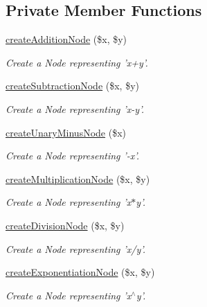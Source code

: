 \subsection*{Private Member Functions}
\begin{DoxyCompactItemize}
\item 
\hyperlink{classMathParser_1_1Interpreting_1_1Differentiator_a0ca77a885d67637f3858e524fe25f94f}{create\-Addition\-Node} (\$x, \$y)
\begin{DoxyCompactList}\small\item\em Create a Node representing 'x+y'. \end{DoxyCompactList}\item 
\hyperlink{classMathParser_1_1Interpreting_1_1Differentiator_aad54652f37938c29c9a426fd568746c8}{create\-Subtraction\-Node} (\$x, \$y)
\begin{DoxyCompactList}\small\item\em Create a Node representing 'x-\/y'. \end{DoxyCompactList}\item 
\hyperlink{classMathParser_1_1Interpreting_1_1Differentiator_a08a7721f2512b45848054ff53ff0a3a5}{create\-Unary\-Minus\-Node} (\$x)
\begin{DoxyCompactList}\small\item\em Create a Node representing '-\/x'. \end{DoxyCompactList}\item 
\hyperlink{classMathParser_1_1Interpreting_1_1Differentiator_a76e94a286700f2913e1f69b985ccd110}{create\-Multiplication\-Node} (\$x, \$y)
\begin{DoxyCompactList}\small\item\em Create a Node representing 'x$\ast$y'. \end{DoxyCompactList}\item 
\hyperlink{classMathParser_1_1Interpreting_1_1Differentiator_a5ba6c413896c0e4d05f579898df23204}{create\-Division\-Node} (\$x, \$y)
\begin{DoxyCompactList}\small\item\em Create a Node representing 'x/y'. \end{DoxyCompactList}\item 
\hyperlink{classMathParser_1_1Interpreting_1_1Differentiator_ac58a93d3f4696e2adbd152f2f78d65c6}{create\-Exponentiation\-Node} (\$x, \$y)
\begin{DoxyCompactList}\small\item\em Create a Node representing 'x$^\wedge$y'. \end{DoxyCompactList}\end{DoxyCompactItemize}
